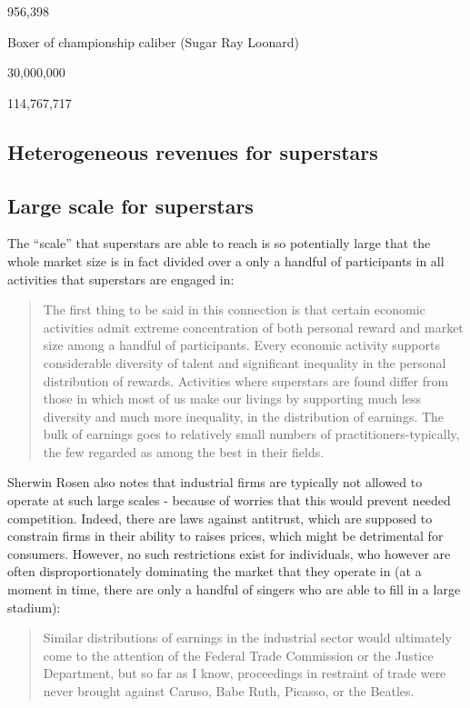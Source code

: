 \documentclass[]{book}
\theoremstyle{definition}
\theoremstyle{definition}
\theoremstyle{definition}
\theoremstyle{remark}
\begin{document}
956,398

Boxer of championship caliber (Sugar Ray Loonard)

30,000,000

114,767,717

\hypertarget{inequality}{\subsection{Heterogeneous revenues for
superstars}\label{inequality}}

\hypertarget{scale}{\subsection{Large scale for
superstars}\label{scale}}

The ``scale'' that superstars are able to reach is so potentially large
that the whole market size is in fact divided over a only a handful of
participants in all activities that superstars are engaged in:

\begin{quote}
The first thing to be said in this connection is that certain economic
activities admit extreme concentration of both personal reward and
market size among a handful of participants. Every economic activity
supports considerable diversity of talent and significant inequality in
the personal distribution of rewards. Activities where superstars are
found differ from those in which most of us make our livings by
supporting much less diversity and much more inequality, in the
distribution of earnings. The bulk of earnings goes to relatively small
numbers of practitioners-typically, the few regarded as among the best
in their fields.
\end{quote}

Sherwin Rosen also notes that industrial firms are typically not allowed
to operate at such large scales - because of worries that this would
prevent needed competition. Indeed, there are laws against antitrust,
which are supposed to constrain firms in their ability to raises prices,
which might be detrimental for consumers. However, no such restrictions
exist for individuals, who however are often disproportionately
dominating the market that they operate in (at a moment in time, there
are only a handful of singers who are able to fill in a large stadium):

\begin{quote}
Similar distributions of earnings in the industrial sector would
ultimately come to the attention of the Federal Trade Commission or the
Justice Department, but so far as I know, proceedings in restraint of
trade were never brought against Caruso, Babe Ruth, Picasso, or the
Beatles.
\end{quote}
\end{document}
